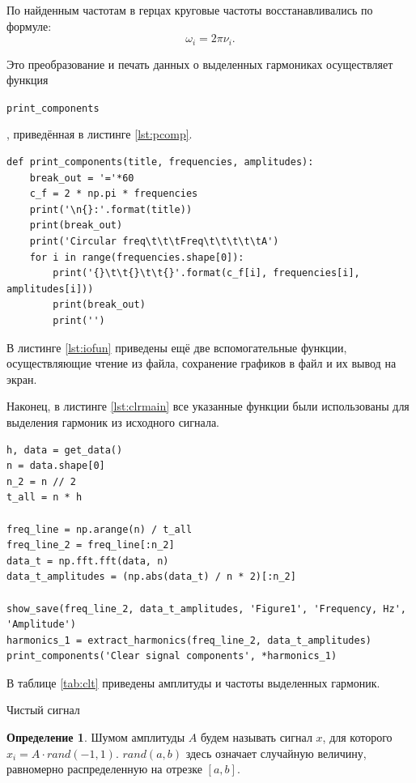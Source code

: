 \documentclass[a4paper,14pt]{article}
\newcommand{\code}[1]{\begin{normalsize}\texttt{#1}\end{normalsize}}
\newcommand{\csvfreqtable}[3]{
	\begin{table}[H]
		\centering
		\csvreader[
			tabular=|c|c|c|c|,
			table head=\hline \textbf{№} & \textbf{Круговая частота} & \textbf{Частота, Гц} & \textbf{Амплитуда}\\\hline,
			late after line=\\\hline
		]{#1}{w=\csvw, nu=\csvnu, ampl=\csvampl}{\thecsvrow & \csvw & \csvnu & \csvampl}
		\caption{#2}
		\label{#3}
	\end{table}
}
\theoremstyle{definition}
\newtheorem{defn}{Определение}
\begin{document}
	По найденным частотам в герцах круговые частоты восстанавливались по формуле:
	\begin{equation}
	\omega_i = 2 \pi \nu_i.
	\end{equation}
	
	Это преобразование и печать данных о выделенных гармониках осуществляет функция \code{print\_components}, приведённая в листинге \ref{lst:pcomp}.
	\begin{lstlisting}[style=py, caption={Функция print\_components}, label={lst:pcomp}]
def print_components(title, frequencies, amplitudes):
	break_out = '='*60
	c_f = 2 * np.pi * frequencies
	print('\n{}:'.format(title))
	print(break_out)
	print('Circular freq\t\t\tFreq\t\t\t\t\tA')
	for i in range(frequencies.shape[0]):
		print('{}\t\t{}\t\t{}'.format(c_f[i], frequencies[i], amplitudes[i]))
		print(break_out)
		print('')
	\end{lstlisting} 
	
	В листинге \ref{lst:iofun} приведены ещё две вспомогательные функции, осуществляющие чтение из файла, сохранение графиков в файл и их вывод на экран.
	
	
	Наконец, в листинге \ref{lst:clrmain} все указанные функции были использованы для выделения гармоник из исходного сигнала.
	\begin{lstlisting}[style=py, caption={Обработка исходного сигнала}, label={lst:clrmain}]
h, data = get_data()
n = data.shape[0]
n_2 = n // 2
t_all = n * h

freq_line = np.arange(n) / t_all
freq_line_2 = freq_line[:n_2]
data_t = np.fft.fft(data, n)
data_t_amplitudes = (np.abs(data_t) / n * 2)[:n_2]

show_save(freq_line_2, data_t_amplitudes, 'Figure1', 'Frequency, Hz', 'Amplitude')
harmonics_1 = extract_harmonics(freq_line_2, data_t_amplitudes)
print_components('Clear signal components', *harmonics_1)
	\end{lstlisting} 
	
	В таблице \ref{tab:clt} приведены амплитуды и частоты выделенных гармоник.
		
	\csvfreqtable{../clear.csv}{Чистый сигнал}{tab:clt}
	
	\begin{defn}
		Шумом амплитуды $A$ будем называть сигнал $x$, для которого $x_i = A \cdot rand(-1, 1)$. $rand(a, b)$ здесь означает случайную величину, равномерно распределенную на отрезке $[a, b]$.
	\end{defn}
	
\end{document}
